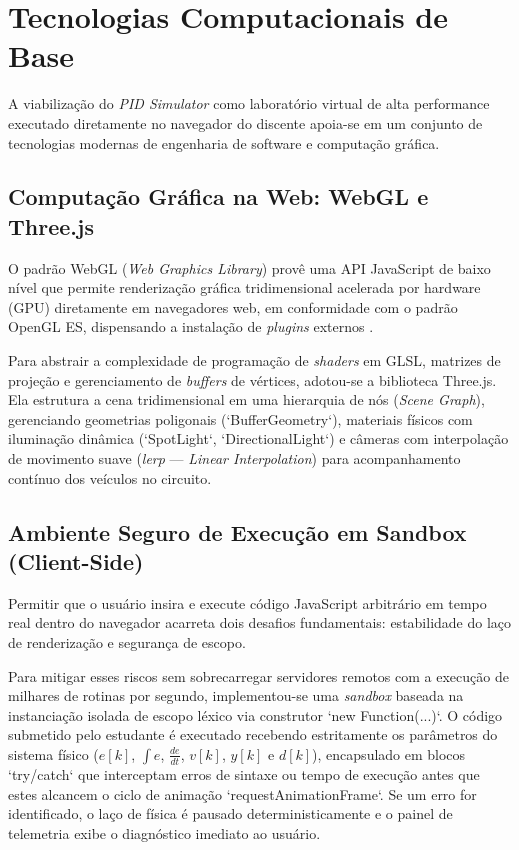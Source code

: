\section{Tecnologias Computacionais de Base}
\label{sec:tecnologias_computacionais}

A viabilização do \textit{PID Simulator} como laboratório virtual de alta performance executado diretamente no navegador do discente apoia-se em um conjunto de tecnologias modernas de engenharia de software e computação gráfica.

\subsection{Computação Gráfica na Web: WebGL e Three.js}
\label{subsec:threejs}

O padrão WebGL (\textit{Web Graphics Library}) provê uma API JavaScript de baixo nível que permite renderização gráfica tridimensional acelerada por hardware (GPU) diretamente em navegadores web, em conformidade com o padrão OpenGL ES, dispensando a instalação de \textit{plugins} externos \cite{dirksen2018}.

Para abstrair a complexidade de programação de \textit{shaders} em GLSL, matrizes de projeção e gerenciamento de \textit{buffers} de vértices, adotou-se a biblioteca Three.js. Ela estrutura a cena tridimensional em uma hierarquia de nós (\textit{Scene Graph}), gerenciando geometrias poligonais (`BufferGeometry`), materiais físicos com iluminação dinâmica (`SpotLight`, `DirectionalLight`) e câmeras com interpolação de movimento suave (\textit{lerp} --- \textit{Linear Interpolation}) para acompanhamento contínuo dos veículos no circuito.

\subsection{Ambiente Seguro de Execução em Sandbox (Client-Side)}
\label{subsec:sandbox_js}

Permitir que o usuário insira e execute código JavaScript arbitrário em tempo real dentro do navegador acarreta dois desafios fundamentais: estabilidade do laço de renderização e segurança de escopo.

Para mitigar esses riscos sem sobrecarregar servidores remotos com a execução de milhares de rotinas por segundo, implementou-se uma \textit{sandbox} baseada na instanciação isolada de escopo léxico via construtor `new Function(...)`. O código submetido pelo estudante é executado recebendo estritamente os parâmetros do sistema físico ($e[k]$, $\int e$, $\frac{de}{dt}$, $v[k]$, $y[k]$ e $d[k]$), encapsulado em blocos `try/catch` que interceptam erros de sintaxe ou tempo de execução antes que estes alcancem o ciclo de animação `requestAnimationFrame`. Se um erro for identificado, o laço de física é pausado deterministicamente e o painel de telemetria exibe o diagnóstico imediato ao usuário.

